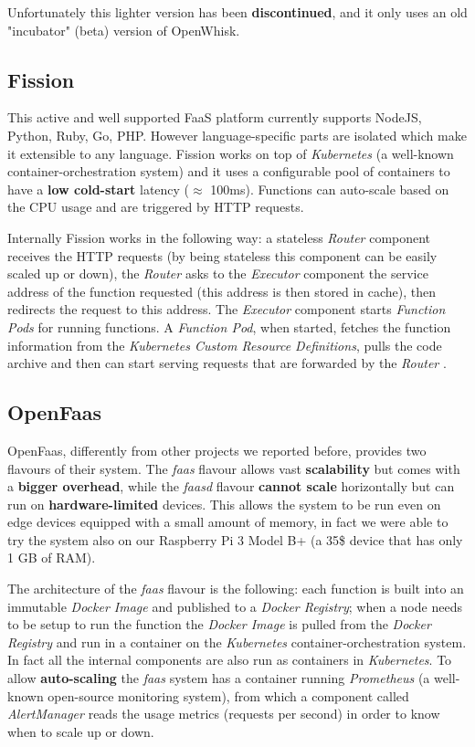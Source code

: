 Unfortunately this lighter version has been \textbf{discontinued}, and it only uses an old "incubator" (beta) version of OpenWhisk.


\subsection{Fission}
This active and well supported FaaS platform currently supports NodeJS, Python, Ruby, Go, PHP. However language-specific parts are isolated which make it extensible to any language.
Fission works on top of \textit{Kubernetes} (a well-known container-orchestration system) and it uses a configurable pool of containers to have a \textbf{low cold-start} latency ($\approx$ 100ms). Functions can auto-scale based on the CPU usage and are triggered by HTTP requests.

Internally Fission works in the following way: a stateless \textit{Router} component receives the HTTP requests (by being stateless this component can be easily scaled up or down), the \textit{Router} asks to the \textit{Executor} component the service address of the function requested (this address is then stored in cache), then redirects the request to this address. The \textit{Executor} component starts \textit{Function Pods} for running functions. A \textit{Function Pod}, when started, fetches the function information from the \textit{Kubernetes Custom Resource Definitions}, pulls the code archive and then can start serving requests that are forwarded by the \textit{Router} \cite{fission-architecture}.


\subsection{OpenFaas}
OpenFaas, differently from other projects we reported before, provides two flavours of their system. The \textit{faas} flavour allows vast \textbf{scalability} but comes with a \textbf{bigger overhead}, while the \textit{faasd} flavour \textbf{cannot scale} horizontally but can run on \textbf{hardware-limited} devices. This allows the system to be run even on edge devices equipped with a small amount of memory, in fact we were able to try the system also on our Raspberry Pi 3 Model B+ (a 35\$ device that has only 1 GB of RAM).

The architecture of the \textit{faas} flavour is the following: each function is built into an immutable \textit{Docker Image} and published to a \textit{Docker Registry}; when a node needs to be setup to run the function the \textit{Docker Image} is pulled from the \textit{Docker Registry} and run in a container on the \textit{Kubernetes}  container-orchestration system. In fact all the internal components are also run as containers in \textit{Kubernetes}. To allow \textbf{auto-scaling} the \textit{faas} system has a container running \textit{Prometheus} (a well-known open-source monitoring system), from which a component called \textit{AlertManager} reads the usage metrics (requests per second) in order to know when to scale up or down.

